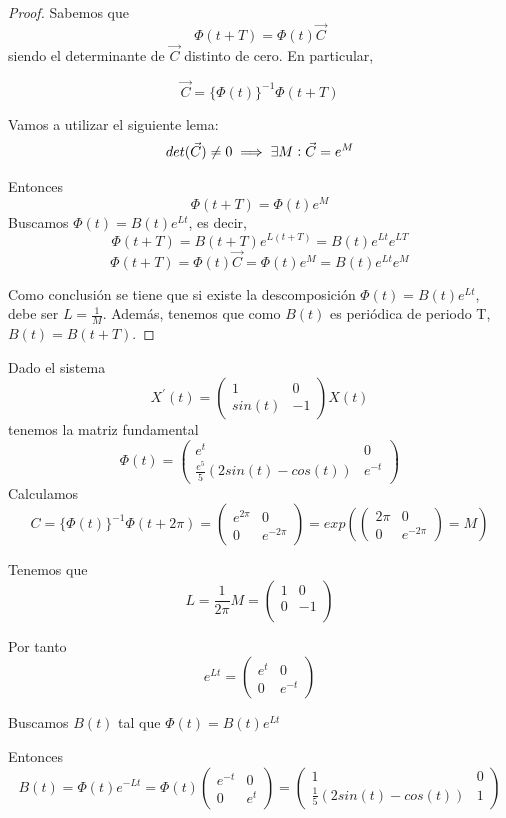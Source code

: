 \documentclass{mathnotes}
\begin{document}
\begin{proof}
Sabemos que $$\Phi(t+T) = \Phi(t)\vec{C}$$ siendo el determinante de $\vec{C}$ distinto de cero. En particular,

$$\vec{C} = \{ \Phi(t)\} ^{-1} \Phi(t+T)$$

Vamos a utilizar el siguiente lema:
$$det(\vec{C}) \neq 0 \implies \exists M : \vec{C} = e^M$$

Entonces $$\Phi(t+T) = \Phi(t) e^M$$
Buscamos $\Phi(t) = B(t) e^{Lt}$, es decir, $$\Phi(t+T) = B(t+T) e^{L(t+T)} = B(t)e^{Lt}e^{LT}$$
$$\Phi(t+T) = \Phi(t)\vec{C} = \Phi(t)e^M=B(t)e^{Lt}e^M$$

Como conclusión se tiene que si existe la descomposición $\Phi(t) = B(t)e^{Lt}$, debe ser $L = \frac{1}{M}$. Además, tenemos que como $B(t)$ es periódica de periodo T, $B(t) = B(t+T)$.

\end{proof}

\begin{example}
Dado el sistema $$X^\prime(t) = \begin{pmatrix}
1 & 0\\sin(t) & -1
\end{pmatrix}X(t)$$
tenemos la matriz fundamental $$\Phi(t) = \begin{pmatrix}
e^t & 0\\\frac{e^5}{5}(2sin(t)-cos(t)) & e^{-t}
\end{pmatrix}$$
Calculamos 
$$C = \{ \Phi(t) \}^{-1}\Phi(t+2\pi) = \begin{pmatrix}
e^{2\pi} & 0\\0 & e^{-2\pi}
\end{pmatrix}  = exp(\begin{pmatrix}
2\pi & 0\\0 & e^{-2\pi}
\end{pmatrix} = M) $$

Tenemos que $$L = \frac{1}{2\pi}M = \begin{pmatrix}
1& 0\\ 0 &-1\\
\end{pmatrix}$$

Por tanto
$$e^{Lt} = \begin{pmatrix}
e^t & 0\\0 & e^{-t}
\end{pmatrix}$$

Buscamos $B(t)$ tal que $\Phi(t) = B(t)e^{Lt}$

Entonces
$$B(t) = \Phi(t)e^{-Lt} = \Phi(t) \begin{pmatrix}
e^{-t} & 0\\0 & e^t
\end{pmatrix} = \begin{pmatrix}
1 & 0\\
\frac{1}{5}(2sin(t)-cos(t)) & 1
\end{pmatrix}$$

\end{example}
\end{document}
